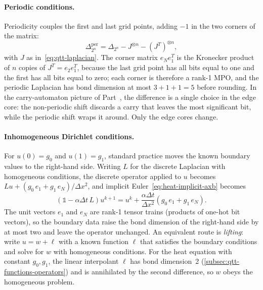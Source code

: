 \paragraph{Periodic conditions.}
Periodicity couples the first and last grid points, adding $-1$ in the two
corners of the matrix:
\begin{equation}
  \Delta^{\mathrm{per}}_{2^n} = \Delta_{2^n} - J^{\otimes n} - (J^{T})^{\otimes n},
  \label{eq:periodic-laplacian}
\end{equation}
with $J$ as in~\eqref{eq:qtt-laplacian}. The corner matrix $e_N e_1^{T}$ is the
Kronecker product of $n$ copies of $J^{T} = e_2 e_1^{T}$, because the last grid
point has all bits equal to one and the first has all bits equal to zero; each
corner is therefore a rank-1 MPO, and the periodic Laplacian has bond dimension
at most $3 + 1 + 1 = 5$ before rounding. In the carry-automaton picture of
Part~, the difference is a single choice in the edge core: the
non-periodic shift discards a carry that leaves the most significant bit, while
the periodic shift wraps it around. Only the edge cores change.

\paragraph{Inhomogeneous Dirichlet conditions.}
For $u(0) = g_0$ and $u(1) = g_1$, standard practice moves the known boundary
values to the right-hand side. Writing $L$ for the discrete Laplacian with
homogeneous conditions, the discrete operator applied to $u$ becomes
$L u + (g_0\, e_1 + g_1\, e_N)/\Delta x^2$, and implicit
Euler~\eqref{eq:heat-implicit-axb} becomes
\begin{equation*}
  \left(\mathbb{1} - \alpha \Delta t\, L\right) u^{k+1}
  = u^{k} + \frac{\alpha \Delta t}{\Delta x^2}\left(g_0\, e_1 + g_1\, e_N\right).
\end{equation*}
The unit vectors $e_1$ and $e_N$ are rank-1 tensor trains (products of one-hot
bit vectors), so the boundary data raise the bond dimension of the right-hand
side by at most two and leave the operator unchanged. An equivalent route is
\emph{lifting}: write $u = w + \ell$ with a known function $\ell$ that satisfies
the boundary conditions and solve for $w$ with homogeneous conditions. For the
heat equation with constant $g_0, g_1$, the linear interpolant $\ell$ has bond
dimension~2 (\cref{subsec:qtt-functions-operators}) and is annihilated by the
second difference, so $w$ obeys the homogeneous problem.

